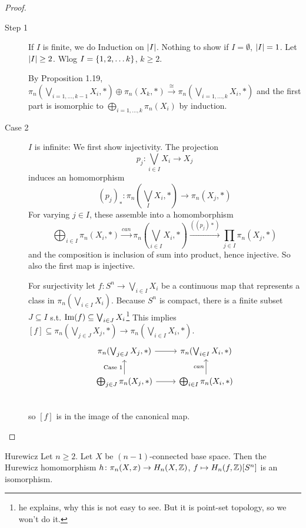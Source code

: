 \documentclass[language=english]{TemplateLecture}
\begin{document}
\begin{proof}
    \begin{description}
        \item[Step 1] If \(I\) is finite, we do Induction on \(\lvert I\rvert\). Nothing to show if \(I = \emptyset\), \(\lvert I\rvert = 1\). Let \(\lvert I\rvert \geq 2\). Wlog \(I = \{1,2, \dots k\}\), \(k\geq 2\).
        
        By Proposition 1.19, \(\pi_n(\bigvee_{i = 1, \dots, k-1}X_i, *) \oplus \pi_n(X_k, *) \xrightarrow{\cong} \pi_n(\bigvee_{i = 1,\dots, k} X_i, *)\) and the first part is isomorphic to \(\bigoplus_{i = 1,\dots, k} \pi_n(X_i)\) by induction.

        \item[Case 2] \(I\) is infinite: We first show injectivity. The projection
        \[p_j\colon \bigvee_{i\in I} X_i \to X_j\]
        induces an homomorphism
        \[(p_j)_*\colon \pi_n(\bigvee_I X_i, *) \to \pi_n(X_j, *)\]
        For varying \(j\in I\), these assemble into a homomborphism
        \[\bigoplus_{i\in I}\pi_n(X_i,*)\xrightarrow{can} \pi_n(\bigvee_{i\in I} X_i, *) \xrightarrow{((p_j)*)} \prod_{j\in I} \pi_n(X_j, *)\]
        and the composition is inclusion of sum into product, hence injective. So also the first map is injective.

        For surjectivity let \(f\colon S^n \to \bigvee_{i\in I}X_i\) be a continuous map that represents a class in \(\pi_n(\bigvee_{i\in I} X_i)\). Because \(S^n\) is compact, there is a finite subset \(J\subseteq I\) s.t. \(\operatorname{Im}(f)\subseteq \bigvee_{i \in J} X_i\)\footnote{he explains, why this is not easy to see. But it is point-set topology, so we won't do it.} This implies \([f] \subseteq \pi_n(\bigvee_{j \in J} X_j,*) \to \pi_n(\bigvee_{i\in I} X_i, *)\).
        \[\begin{tikzcd}
            \pi_n(\bigvee_{j\in J}X_j, *) \ar[r] & \pi_n(\bigvee_{i \in I}X_i, *) \\
            \bigoplus_{j\in J} \pi_n(X_j,*) \ar[u, "\text{Case 1}"] \ar[r] & \bigoplus_{i\in I} \pi_n(X_i, *) \ar[u, "can"] \\
        \end{tikzcd}\]
        so \([f]\) is in the image of the canonical map.
    \end{description}
\end{proof}

\begin{thm}{Hurewicz}{}
    Let \(n\geq 2\). Let \(X\) be \((n-1)\)-connected base space. Then the Hurewicz homomorphism \(h\colon \pi_n(X,x)\to H_n(X,\mathbb{Z})\), \(f\mapsto H_n(f, \mathbb{Z})[S^n]\) is an isomorphism.
\end{thm}
\end{document}
